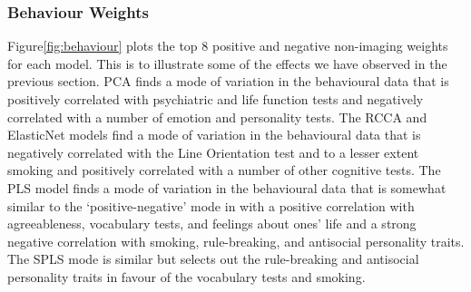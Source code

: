 \subsubsection{Behaviour Weights}

Figure\ref{fig:behaviour} plots the top 8 positive and negative non-imaging \gls{weights} for each model.
This is to illustrate some of the effects we have observed in the previous section.
PCA finds a mode of variation in the behavioural data that is positively correlated with psychiatric and life function tests and negatively correlated with a number of emotion and personality tests.
The RCCA and ElasticNet models find a mode of variation in the behavioural data that is negatively correlated with the Line Orientation test and to a lesser extent smoking and positively correlated with a number of other cognitive tests.
The PLS model finds a mode of variation in the behavioural data that is somewhat similar to the `positive-negative' mode in \cite{smith2015positive} with a positive correlation with agreeableness, vocabulary tests, and feelings about ones' life and a strong negative correlation with smoking, rule-breaking, and antisocial personality traits.
The SPLS mode is similar but selects out the rule-breaking and antisocial personality traits in favour of the vocabulary tests and smoking.

